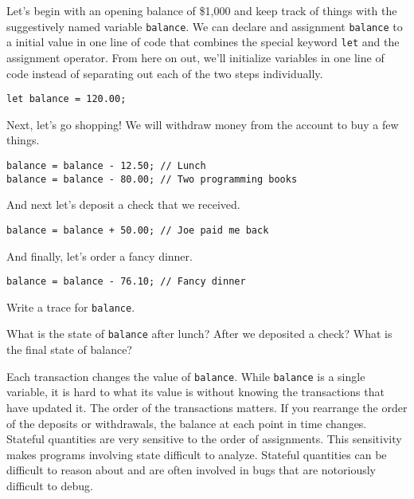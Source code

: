 Let's begin with an opening balance of \$1,000 and keep track of things with the
suggestively named variable \texttt{balance}. We can declare and assignment
\texttt{balance} to a initial value in one line of code that combines the
special keyword \texttt{let} and the assignment operator. From here on out,
we'll initialize variables in one line of code instead of separating out each of
the two steps individually.

\begin{lstlisting}
let balance = 120.00;
\end{lstlisting}

Next, let's go shopping! We will withdraw money from the account to buy a few
things.

\begin{lstlisting}
balance = balance - 12.50; // Lunch
balance = balance - 80.00; // Two programming books
\end{lstlisting}

And next let's deposit a check that we received.

\begin{lstlisting}
balance = balance + 50.00; // Joe paid me back
\end{lstlisting}

And finally, let's order a fancy dinner.

\begin{lstlisting}
balance = balance - 76.10; // Fancy dinner
\end{lstlisting}

\begin{question}
  Write a trace for \texttt{balance}.
\end{question}


\begin{question}
What is the state of \texttt{balance} after lunch? After we deposited a check?
What is the final state of balance?
\end{question}

Each transaction changes the value of \texttt{balance}. While \texttt{balance}
is a single variable, it is hard to what its value is without knowing the
transactions that have updated it. The order of the transactions matters. If you
rearrange the order of the deposits or withdrawals, the balance at each point in
time changes. Stateful quantities are very sensitive to the order of
assignments. This sensitivity makes programs involving state difficult to
analyze. Stateful quantities can be difficult to reason about and are often
involved in bugs that are notoriously difficult to debug.

